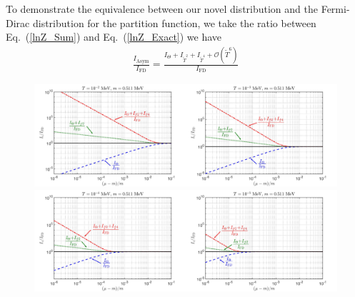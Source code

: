 \documentclass[sn-mathphys,Numbered]{sn-jnl}
\newcommand{\wt}[1]{\widetilde{#1}}
\begin{document}
To demonstrate the equivalence between our novel distribution and the Fermi-Dirac distribution for the partition function, we take the ratio between Eq.~(\ref{lnZ_Sum}) and Eq.~(\ref{lnZ_Exact}) we have
\begin{align}\label{lnZ_Ratio}
\frac{I_\mathrm{Asym}}{I_\mathrm{FD}}=\frac{I_{\Theta}+I_{\wt{T}^2}+I_{\wt{T}^4}+\mathcal{O}(\wt{T}^6)}{I_\mathrm{FD}}
\end{align}
\begin{figure}[t]
\centering
\includegraphics[width=0.5\textwidth]{./plot/Lowmu_T2}\includegraphics[width=0.5\textwidth]{./plot/Lowmu_T3}\\
\includegraphics[width=0.5\textwidth]{./plot/Lowmu_T4}\includegraphics[width=0.5\textwidth]{./plot/Lowmu_T5}

\end{figure}
\end{document}
